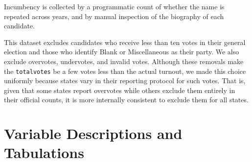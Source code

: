 \documentclass[12pt]{article}
\begin{document}
Incumbency is collected by a programmatic count of whether the name is repeated across years, and by manual inspection of the biography of each candidate.

This dataset excludes candidates who receive less than ten votes in their general election and those who identify Blank or Miscellaneous as their party.
We also exclude overvotes, undervotes, and invalid votes.
Although these removals make the \texttt{totalvotes} be a few votes less than the actual turnout, we made this choice uniformly because states vary in their reporting protocol for such votes. That is, given that some states report overvotes while others exclude them entirely in their official counts, it is more internally consistent to exclude them for all states.

\section{Variable Descriptions and Tabulations}
\end{document}
